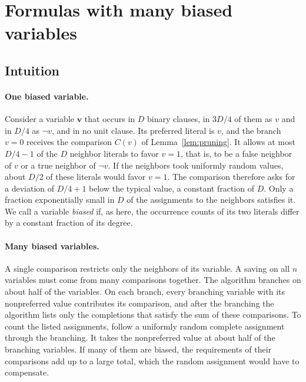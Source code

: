 \documentclass[11pt,a4paper]{article}
\theoremstyle{definition}
\theoremstyle{remark}
\begin{document}
\section{Formulas with many biased variables}\label{sec:bias}

\subsection{Intuition}\label{sec:bias_intuition}

\paragraph{One biased variable.}
Consider a variable $\mathbf v$ that occurs in $D$ binary clauses, in
$3D/4$ of them as $v$ and in $D/4$ as $\neg v$, and in no unit clause. Its preferred literal is $v$, and the branch $v=0$ receives the
comparison $C(v)$ of Lemma~\ref{lem:pruning}. It allows at most $D/4-1$ of
the $D$ neighbor literals to favor $v=1$, that is, to be a false neighbor
of $v$ or a true neighbor of $\neg v$. If the neighbors took uniformly
random values, about $D/2$ of these literals would favor $v=1$. The
comparison therefore asks for a deviation of $D/4+1$ below the typical
value, a constant fraction of $D$. Only a fraction exponentially small in $D$
of the assignments to the neighbors satisfies it. We call a variable
\emph{biased} if, as here, the occurrence counts of its two literals differ
by a constant fraction of its degree.

\paragraph{Many biased variables.}
A single comparison restricts only the neighbors of its variable. A saving
on all $n$ variables must come from many comparisons together. The
algorithm branches on about half of the variables. On each branch, every
branching variable with its nonpreferred value contributes its comparison,
and after the branching the algorithm lists only the completions that
satisfy the sum of these comparisons. To count the listed assignments,
follow a uniformly random complete assignment through the branching. It
takes the nonpreferred value at about half of the branching variables. If
many of them are biased, the requirements of their comparisons add up to a
large total, which the random assignment would have to compensate.
\end{document}
